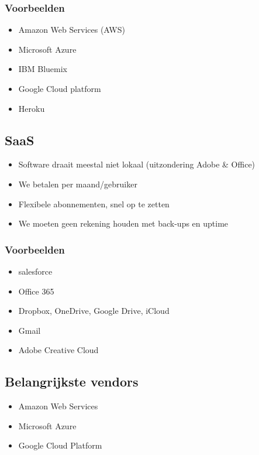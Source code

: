\documentclass{article}
\begin{document}
\subsubsection{Voorbeelden}
\begin{itemize}
    \item Amazon Web Services (AWS)
    \item Microsoft Azure
    \item IBM Bluemix
    \item Google Cloud platform
    \item Heroku
\end{itemize}

\subsection{SaaS}
\begin{itemize}
    \item Software draait meestal niet lokaal (uitzondering Adobe \& Office)
    \item We betalen per maand/gebruiker
    \item Flexibele abonnementen, snel op te zetten
    \item We moeten geen rekening houden met back-ups en uptime
\end{itemize}

\subsubsection{Voorbeelden}
\begin{itemize}
    \item salesforce
    \item Office 365
    \item Dropbox, OneDrive, Google Drive, iCloud
    \item Gmail
    \item Adobe Creative Cloud
\end{itemize}

\subsection{Belangrijkste vendors}
\begin{itemize}
    \item Amazon Web Services
    \item Microsoft Azure
    \item Google Cloud Platform
\end{itemize}
\end{document}
